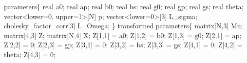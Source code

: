 \documentclass[
  12pt,
  letterpaper,
  DIV=11,
  numbers=noendperiod]{scrartcl}
\newenvironment{Shaded}{\begin{snugshade}}{\end{snugshade}}
\newcommand{\DataTypeTok}[1]{\textcolor[rgb]{0.68,0.00,0.00}{#1}}
\newcommand{\DecValTok}[1]{\textcolor[rgb]{0.68,0.00,0.00}{#1}}
\newcommand{\KeywordTok}[1]{\textcolor[rgb]{0.00,0.23,0.31}{#1}}
\newcommand{\NormalTok}[1]{\textcolor[rgb]{0.00,0.23,0.31}{#1}}
\begin{document}
\begin{Shaded}
\begin{Highlighting}[]
\KeywordTok{parameters}\NormalTok{\{}
  \DataTypeTok{real}\NormalTok{ a0;}
  \DataTypeTok{real}\NormalTok{ ap;}
  \DataTypeTok{real}\NormalTok{ b0;}
  \DataTypeTok{real}\NormalTok{ bs;}
  \DataTypeTok{real}\NormalTok{ g0;}
  \DataTypeTok{real}\NormalTok{ gp;}
  \DataTypeTok{real}\NormalTok{ gs;}
  \DataTypeTok{real}\NormalTok{ theta;}
  \DataTypeTok{vector}\NormalTok{\textless{}}\KeywordTok{lower}\NormalTok{=}\DecValTok{0}\NormalTok{, }\KeywordTok{upper}\NormalTok{=}\DecValTok{1}\NormalTok{\textgreater{}[N] p;}
  \DataTypeTok{vector}\NormalTok{\textless{}}\KeywordTok{lower}\NormalTok{=}\DecValTok{0}\NormalTok{\textgreater{}[}\DecValTok{3}\NormalTok{] L\_sigma;}
  \DataTypeTok{cholesky\_factor\_corr}\NormalTok{[}\DecValTok{3}\NormalTok{] L\_Omega;}
\NormalTok{\}}
\KeywordTok{transformed parameters}\NormalTok{\{}
  \DataTypeTok{matrix}\NormalTok{[N,}\DecValTok{3}\NormalTok{] Mu;}
  \DataTypeTok{matrix}\NormalTok{[}\DecValTok{4}\NormalTok{,}\DecValTok{3}\NormalTok{] Z;}
  \DataTypeTok{matrix}\NormalTok{[N,}\DecValTok{4}\NormalTok{] X;}
\NormalTok{  Z[}\DecValTok{1}\NormalTok{,}\DecValTok{1}\NormalTok{] = a0;}
\NormalTok{  Z[}\DecValTok{1}\NormalTok{,}\DecValTok{2}\NormalTok{] = b0;}
\NormalTok{  Z[}\DecValTok{1}\NormalTok{,}\DecValTok{3}\NormalTok{] = g0;}
\NormalTok{  Z[}\DecValTok{2}\NormalTok{,}\DecValTok{1}\NormalTok{] = ap;}
\NormalTok{  Z[}\DecValTok{2}\NormalTok{,}\DecValTok{2}\NormalTok{] = }\DecValTok{0}\NormalTok{;}
\NormalTok{  Z[}\DecValTok{2}\NormalTok{,}\DecValTok{3}\NormalTok{] = gp;}
\NormalTok{  Z[}\DecValTok{3}\NormalTok{,}\DecValTok{1}\NormalTok{] = }\DecValTok{0}\NormalTok{;}
\NormalTok{  Z[}\DecValTok{3}\NormalTok{,}\DecValTok{2}\NormalTok{] = bs;}
\NormalTok{  Z[}\DecValTok{3}\NormalTok{,}\DecValTok{3}\NormalTok{] = gs;}
\NormalTok{  Z[}\DecValTok{4}\NormalTok{,}\DecValTok{1}\NormalTok{] = }\DecValTok{0}\NormalTok{;}
\NormalTok{  Z[}\DecValTok{4}\NormalTok{,}\DecValTok{2}\NormalTok{] = theta;}
\NormalTok{  Z[}\DecValTok{4}\NormalTok{,}\DecValTok{3}\NormalTok{] = }\DecValTok{0}\NormalTok{;}


\end{Highlighting}
\end{Shaded}
\end{document}
